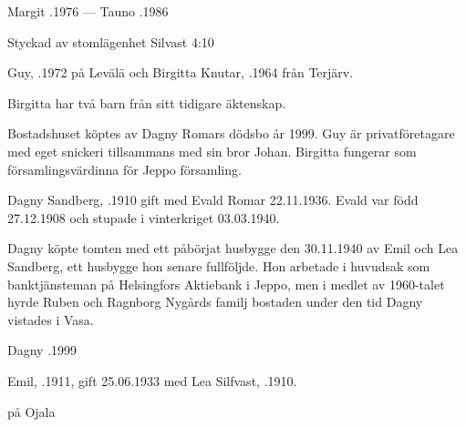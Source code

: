Margit .1976  ---  Tauno .1986



%

Styckad av stomlägenhet Silvast 4:10


%
Guy, .1972 på Levälä och Birgitta Knutar, .1964 från Terjärv.
\begin{jhchildren}
  \item {}
\end{jhchildren}

Birgitta har två barn från sitt tidigare äktenskap.
\begin{jhchildren}
  \item {}
  \item {}
\end{jhchildren}
Bostadshuset köptes av Dagny Romars dödsbo år 1999. Guy är privatföretagare med eget snickeri tillsammans med sin bror Johan. Birgitta fungerar som församlingsvärdinna för Jeppo församling.


%
Dagny Sandberg, .1910 gift med Evald Romar 22.11.1936. Evald var född 27.12.1908 och stupade i vinterkriget 03.03.1940.
\begin{jhchildren}
  \item {}
  \item {}
\end{jhchildren}
Dagny köpte tomten med ett påbörjat husbygge den 30.11.1940 av Emil och Lea Sandberg, ett husbygge hon senare fullföljde. Hon arbetade i huvudsak som banktjänsteman på Helsingfors Aktiebank i Jeppo, men i medlet av 1960-talet hyrde Ruben och Ragnborg Nygårds familj bostaden under den tid Dagny vistades i Vasa.

Dagny .1999


%
Emil, .1911, gift 25.06.1933 med Lea Silfvast, .1910.
\begin{jhchildren}
  \item {}
  \item {}
  \item {} på Ojala
\end{jhchildren}

